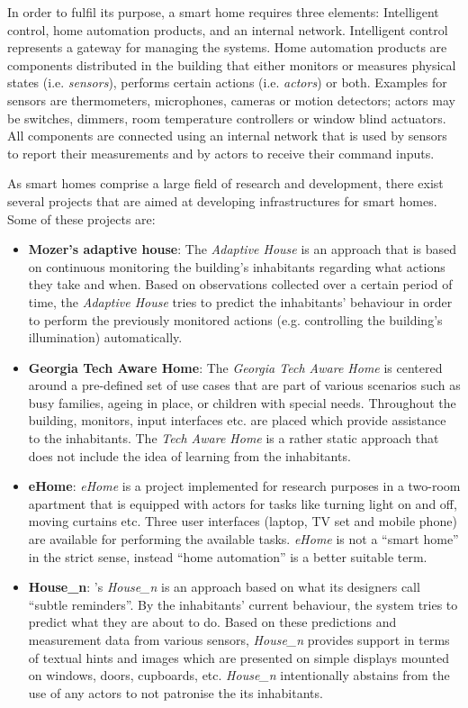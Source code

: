 In order to fulfil its purpose, a smart home requires three elements: Intelligent control, home automation products, and an internal network. Intelligent control represents a gateway for managing the systems. Home automation products are components distributed in the building that either monitors or measures physical states (i.e. \emph{sensors}), performs certain actions (i.e. \emph{actors}) or both. Examples for sensors are thermometers, microphones, cameras or motion detectors; actors may be switches, dimmers, room temperature controllers or window blind actuators. All components are connected using an internal network that is used by sensors to report their measurements and by actors to receive their command inputs.

As smart homes comprise a large field of research and development, there exist several projects that are aimed at developing infrastructures for smart homes. Some of these projects are:
\begin{itemize}
  \item \textbf{Mozer's adaptive house}: The \emph{Adaptive House} is an approach that is based on continuous monitoring the building's inhabitants regarding what actions they take and when. Based on observations collected over a certain period of time, the \emph{Adaptive House} tries to predict the inhabitants' behaviour in order to perform the previously monitored actions (e.g. controlling the building's illumination) automatically.~\cite{adaptivehouse}
  \item \textbf{Georgia Tech Aware Home}: The \emph{Georgia Tech Aware Home} is centered around a pre-defined set of use cases that are part of various scenarios such as busy families, ageing in place, or children with special needs. Throughout the building, monitors, input interfaces etc. are placed which provide assistance to the inhabitants. The \emph{Tech Aware Home} is a rather static approach that does not include the idea of learning from the inhabitants.~\cite{techawarehome}
  \item \textbf{eHome}: \emph{eHome} is a project implemented for research purposes in a two-room apartment that is equipped with actors for tasks like turning light on and off, moving curtains etc. Three user interfaces (laptop, TV set and mobile phone) are available for performing the available tasks. \emph{eHome} is not a ``smart home'' in the strict sense, instead ``home automation'' is a better suitable term.~\cite{ehome}
  \item \textbf{House\_n}: 's \emph{House\_n} is an approach based on what its designers call ``subtle reminders''. By the inhabitants' current behaviour, the system tries to predict what they are about to do. Based on these predictions and measurement data from various sensors, \emph{House\_n} provides support in terms of textual hints and images which are presented on simple displays mounted on windows, doors, cupboards, etc. \emph{House\_n} intentionally abstains from the use of any actors to not patronise the its inhabitants.~\cite{housen}
\end{itemize}

